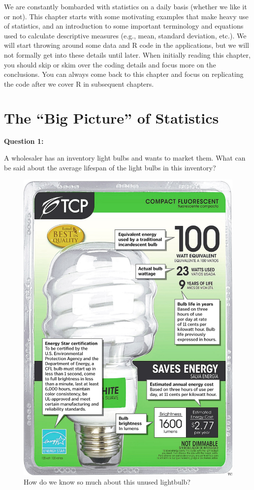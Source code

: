 \documentclass[
]{book}
\begin{document}
We are constantly bombarded with statistics on a daily basis (whether we like it or not). This chapter starts with some motivating examples that make heavy use of statistics, and an introduction to some important terminology and equations used to calculate descriptive measures (e.g., mean, standard deviation, etc.). We will start throwing around some data and R code in the applications, but we will not formally get into these details until later. When initially reading this chapter, you should skip or skim over the coding details and focus more on the conclusions. You can always come back to this chapter and focus on replicating the code after we cover R in subsequent chapters.

\hypertarget{the-big-picture-of-statistics}{%
\section{The ``Big Picture'' of Statistics}\label{the-big-picture-of-statistics}}

\textbf{Question 1:}

A wholesaler has an inventory light bulbs and wants to market them. What can be said about the average lifespan of the light bulbs in this inventory?

\begin{figure}

{\centering \includegraphics[width=0.5\linewidth]{images/BULB} 

}

\caption{How do we know so much about this unused lightbulb?}\label{fig:unnamed-chunk-3}
\end{figure}
\end{document}
